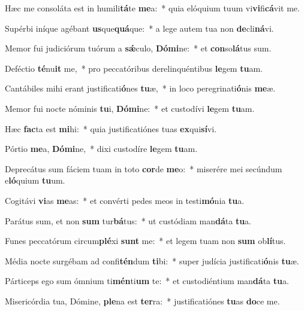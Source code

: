 \item Hæc me consoláta est in humili\textbf{tá}te \textbf{me}a:~* quia elóquium tuum vi\textbf{vi}fi\textbf{cá}vit me.
\item Supérbi iníque agébant \textbf{us}que\textbf{quá}que:~* a lege autem tua non \textbf{de}cli\textbf{ná}vi.
\item Memor fui judiciórum tuórum a \textbf{sǽ}culo, \textbf{Dó}\textbf{mi}ne:~* et \textbf{con}so\textbf{lá}tus sum.
\item Deféctio \textbf{té}nu\textbf{it} me,~* pro peccatóribus derelinquéntibus \textbf{le}gem \textbf{tu}am.
\item Cantábiles mihi erant justificati\textbf{ó}nes \textbf{tu}æ,~* in loco peregrinati\textbf{ó}nis \textbf{me}æ.
\item Memor fui nocte nóminis \textbf{tu}i, \textbf{Dó}\textbf{mi}ne:~* et custodívi \textbf{le}gem \textbf{tu}am.
\item Hæc \textbf{fac}ta est \textbf{mi}hi:~* quia justificatiónes tuas \textbf{ex}qui\textbf{sí}vi.
\item Pórtio \textbf{me}a, \textbf{Dó}\textbf{mi}ne,~* dixi custodíre \textbf{le}gem \textbf{tu}am.
\item Deprecátus sum fáciem tuam in toto \textbf{cor}de \textbf{me}o:~* miserére mei secúndum e\textbf{ló}quium \textbf{tu}um.
\item Cogitávi \textbf{vi}as \textbf{me}as:~* et convérti pedes meos in testi\textbf{mó}nia \textbf{tu}a.
\item Parátus sum, et non \textbf{sum} tur\textbf{bá}tus:~* ut custódiam man\textbf{dá}ta \textbf{tu}a.
\item Funes peccatórum circum\textbf{plé}xi \textbf{sunt} me:~* et legem tuam non \textbf{sum} ob\textbf{lí}tus.
\item Média nocte surgébam ad confi\textbf{tén}dum \textbf{ti}bi:~* super judícia justificati\textbf{ó}nis \textbf{tu}æ.
\item Párticeps ego sum ómnium ti\textbf{mén}ti\textbf{um} te:~* et custodiéntium man\textbf{dá}ta \textbf{tu}a.
\item Misericórdia tua, Dómine, \textbf{ple}na est \textbf{ter}ra:~* justificatiónes \textbf{tu}as \textbf{do}ce me.
